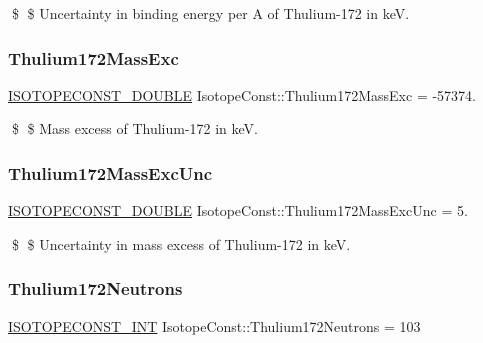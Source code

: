 \$ \$ Uncertainty in binding energy per A of Thulium-\/172 in keV. \mbox{\label{group___isotope_const-_thulium-_tm172_ga43154eb1f3d811ba2c2a049ab6e092f0}} 
\subsubsection{\texorpdfstring{Thulium172\+Mass\+Exc}{Thulium172MassExc}}
{\footnotesize\ttfamily \mbox{\hyperlink{group___isotope_const-_macros_ga8f45a7272ce02c0b4c65c44636ed719a}{I\+S\+O\+T\+O\+P\+E\+C\+O\+N\+S\+T\+\_\+\+D\+O\+U\+B\+LE}} Isotope\+Const\+::\+Thulium172\+Mass\+Exc = -\/57374.}

\$ \$ Mass excess of Thulium-\/172 in keV. \mbox{\label{group___isotope_const-_thulium-_tm172_gac83f9b99c2015348031c79bd7b6cad2f}} 
\subsubsection{\texorpdfstring{Thulium172\+Mass\+Exc\+Unc}{Thulium172MassExcUnc}}
{\footnotesize\ttfamily \mbox{\hyperlink{group___isotope_const-_macros_ga8f45a7272ce02c0b4c65c44636ed719a}{I\+S\+O\+T\+O\+P\+E\+C\+O\+N\+S\+T\+\_\+\+D\+O\+U\+B\+LE}} Isotope\+Const\+::\+Thulium172\+Mass\+Exc\+Unc = 5.}

\$ \$ Uncertainty in mass excess of Thulium-\/172 in keV. \mbox{\label{group___isotope_const-_thulium-_tm172_ga386cca7c781130a98e053e5300a37e1c}} 
\subsubsection{\texorpdfstring{Thulium172\+Neutrons}{Thulium172Neutrons}}
{\footnotesize\ttfamily \mbox{\hyperlink{group___isotope_const-_macros_ga5f18360b3e99483a35c32d789e62621c}{I\+S\+O\+T\+O\+P\+E\+C\+O\+N\+S\+T\+\_\+\+I\+NT}} Isotope\+Const\+::\+Thulium172\+Neutrons = 103}

